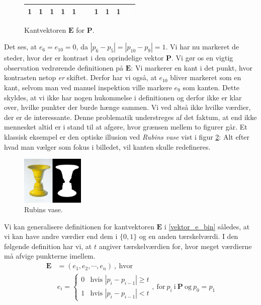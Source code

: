 {\begin{figure}[!h]
    \renewcommand{\arraystretch}{1.3}
    \centering
    \begin{tabular}{|c|c|c|c|c|c|c|c|c|c|}
        \hline
        1 & 1 & 1 & 1 & 1 & \cellcolor{black}\textcolor{white}{0} & 1 &
        1 & 1 & \cellcolor{black}\textcolor{white}{0} \\\hline
    \end{tabular}
    \caption[]{Kantvektoren $\mathbf{E}$ for $\mathbf{P}$.}
    \label{vektor_e_edge}
\end{figure}
Det ses, at $e_6 = e_{10} = 0$, da $|p_6 - p_5| = |p_{10} - p_9| = 1$.
Vi har nu markeret de steder, hvor der er kontrast i den oprindelige
vektor $\mathbf{P}$. Vi gør os en vigtig observation vedrørende
definitionen på $\mathbf{E}$: Vi markerer en kant i det punkt, hvor
kontrasten netop \emph{er} skiftet. Derfor har vi også, at $e_{10}$
bliver markeret som en kant, selvom man ved manuel inspektion ville
markere $e_9$ som kanten.  Dette skyldes, at vi ikke har nogen
hukommelse i definitionen og derfor ikke er klar over, hvilke punkter
der burde hænge sammen. Vi ved altså ikke hvilke værdier, der er de
interessante. Denne problematik understreges af det faktum, at end ikke
mennesket altid er i stand til at afgøre, hvor grænsen mellem to figurer
går. Et klassisk eksempel er den optiske illusion ved \emph{Rubins
vase}\cite{WikiRubinVase} vist i figur \ref{rubins_vase}: Alt efter hvad
man vælger som fokus i billedet, vil kanten skulle redefineres.

\begin{figure}[!h]
    \begin{center}
        \includegraphics[trim = 84mm 4mm 0mm 0mm, clip, width=3cm]{afsnit/vores_implementation/billeder/kantdetektion/Rubin2}
    \end{center}
    \caption[]{Rubins vase\cite{WikiRubinVasePic}.}
    \label{rubins_vase}
\end{figure}

Vi kan generalisere definitionen for kantvektoren $\mathbf{E}$ i
\ref{vektor_e_bin} således, at vi kan have andre værdier end dem i
$\{0,1\}$ og en anden tærskelværdi. I den følgende definition har vi, at
$t$ angiver tærskelværdien for, hvor meget værdierne må afvige punkterne
imellem.
\begin{equation}
    \begin{split}
        \mathbf{E} &= (e_1, e_2, \cdots, e_n) \mathrm{~,~hvor~} \\
        &e_i = \left\{
        \begin{array}{rl}
            0 & \text{hvis~} |p_i - p_{i - 1}| \geq t\\
            1 & \text{hvis~} |p_i - p_{i - 1}| < t
        \end{array} \right. \mathrm{,~for~} p_i \mathrm{~i~} \mathbf{P}
        \mathrm{~og~} p_0 = p_1
    \end{split}
    \label{vektor_e_generel}
\end{equation}

}
